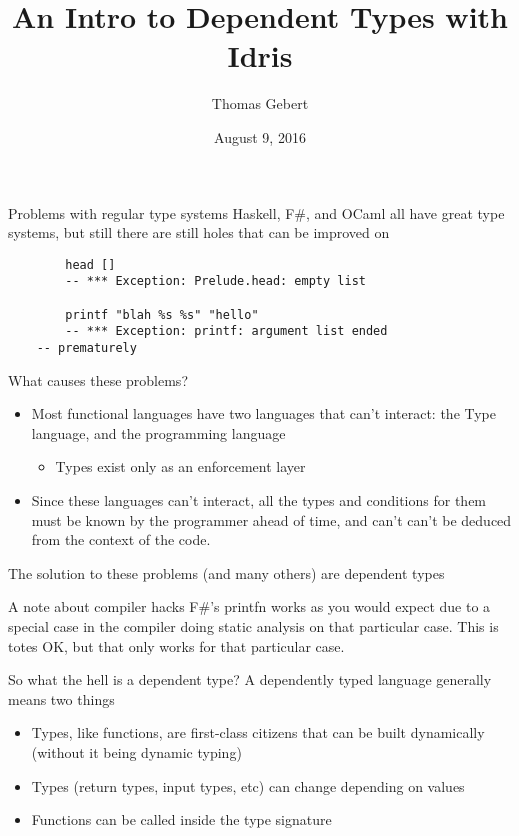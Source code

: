 \documentclass{beamer}
\title{An Intro to Dependent Types with Idris}
\subtitle{}
\author{Thomas Gebert}
\date{August 9, 2016}
\begin{document}
  \frame{\titlepage}
\begin{frame}[fragile]{Problems with regular type systems}
	Haskell, F\#, and OCaml all have great type systems, but still there are still holes that can be improved on
	\begin{lstlisting}
		head []
		-- *** Exception: Prelude.head: empty list

		printf "blah %s %s" "hello"
		-- *** Exception: printf: argument list ended 
    -- prematurely
	\end{lstlisting}

\end{frame}
  \begin{frame}{What causes these problems?}
	  \begin{itemize}
		\item Most functional languages have two languages that can't interact: the Type language, and the programming language \begin{itemize}
			\item Types exist only as an enforcement layer
			\end{itemize}
		\item Since these languages can't interact, all the types and conditions for them must be known by the programmer ahead of time, and can't can't be deduced from the context of the code.
	  \end{itemize}
  \end{frame}
\begin{frame}
\begin{center}
 The solution to these problems (and many others) are dependent types
\end{center}
\end{frame}
\begin{frame}{A note about compiler hacks}
  F\#'s printfn works as you would expect due to a special case in the compiler doing static analysis on that particular case. 
  \linebreak
  \linebreak
  This is totes OK, but that only works for that particular case.
\end{frame}

\begin{frame}{So what the hell is a dependent type? }
	A dependently typed language generally means two things
	\begin{itemize}	
		\item Types, like functions, are first-class citizens that can be built dynamically (without it being dynamic typing)
		\item Types (return types, input types, etc) can change depending on values
                \item Functions can be called inside the type signature
	\end{itemize}
\end{frame}
\end{document}
